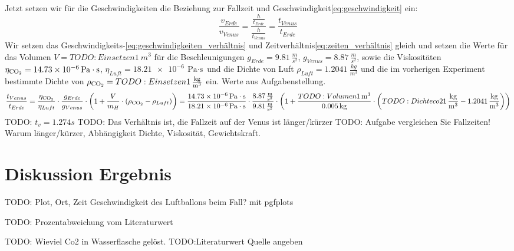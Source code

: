 \documentclass{article}
\begin{document}
        Jetzt setzen wir für die Geschwindigkeiten die Beziehung zur Fallzeit und Geschwindigkeit\ref{eq:geschwindigkeit} ein:
        \begin{equation} \label{eq:zeiten_verhältnis}
            \frac{ v_{Erde} }{ v_{Venus} } = \frac{ \frac{h}{t_{Erde}} }{ \frac{h}{t_{Venus}} } = \frac{t_{Venus}}{t_{Erde}}
        \end{equation}
        Wir setzen das Geschwindigkeits-\ref{eq:geschwindigkeiten_verhältnis} und Zeitverhältnis\ref{eq:zeiten_verhältnis} gleich und setzen die Werte
        für das Volumen \(V = TODO:Einsetzen\SI{1}{m^3}\)
        für die Beschleunigungen \(g_{Erde} = \SI{9.81}{\frac{m}{s^2}} \), \(g_{Venus} = \SI{8.87}{\frac{m}{s^2}} \),
        sowie die Viskositäten \(\eta_{\ce{CO2}} = \SI{14.73e-6}{\pascal \cdot \second} \),  \(\eta_{Luft} = \SI{18.21e-6}{\pascal \cdot \second} \) und
        die Dichte von Luft \(\rho_{Luft} = \SI{1.2041}{\frac{kg}{m^3}}\) und die im vorherigen Experiment bestimmte Dichte von  \(\rho_{\ce{CO2}} = TODO: Einsetzen\SI{1}{\frac{kg}{m^3}} \) ein.
        Werte aus Aufgabenstellung\cite{Aufgabenstellung}.
        \begin{equation}
            \frac{t_{Venus}}{t_{Erde}} = \frac{ \eta_{\ce{CO2}}}{ \eta_{Luft} } \cdot \frac{ g_{Erde} }{ g_{Venus} } \cdot \left( 1 + \frac{V}{m_H} \cdot \left( \rho_{\ce{CO2}} - \rho_{Luft} \right) \right) = 
            \frac{ \SI{14.73e-6}{\pascal \cdot \second} }{ \SI{18.21e-6}{\pascal \cdot \second} } \cdot \frac{ \SI{8.87}{\frac{m}{s^2}} }{ \SI{9.81}{\frac{m}{s^2}} } \cdot
            \left( 1 + \frac{TODO:Volumen\SI{1}{m^3}}{ \SI{0.005}{\kilogram} } \cdot \left( TODO: Dichte co2\SI{1}{\frac{kg}{m^3}} - \SI{1.2041}{\frac{kg}{m^3}} \right) \right)
        \end{equation}
        TODO: \(t_v = 1.274s\)
        TODO: Das Verhältnis ist, die Fallzeit auf der Venus ist länger/kürzer
        TODO: Aufgabe vergleichen Sie Fallzeiten! Warum länger/kürzer, Abhängigkeit Dichte, Viskosität, Gewichtskraft.

    \section{Diskussion Ergebnis}
        TODO: Plot, Ort, Zeit Geschwindigkeit des Luftballons beim Fall? mit pgfplots

        TODO: Prozentabweichung vom Literaturwert

        TODO: Wieviel Co2 in Wasserflasche gelöst.
        TODO:Literaturwert Quelle angeben
\end{document}
